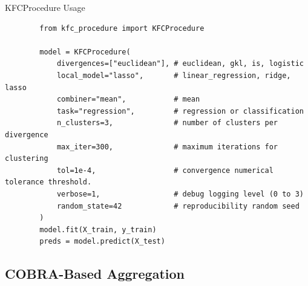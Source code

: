 \begin{frame}[fragile, t]{KFCProcedure Usage}
    \begin{verbatim}
        from kfc_procedure import KFCProcedure

        model = KFCProcedure(
            divergences=["euclidean"], # euclidean, gkl, is, logistic
            local_model="lasso",       # linear_regression, ridge, lasso
            combiner="mean",           # mean
            task="regression",         # regression or classification
            n_clusters=3,              # number of clusters per divergence
            max_iter=300,              # maximum iterations for clustering
            tol=1e-4,                  # convergence numerical tolerance threshold.
            verbose=1,                 # debug logging level (0 to 3)
            random_state=42            # reproducibility random seed
        )
        model.fit(X_train, y_train)
        preds = model.predict(X_test)

    \end{verbatim}
\end{frame}

\subsection{COBRA-Based Aggregation}

